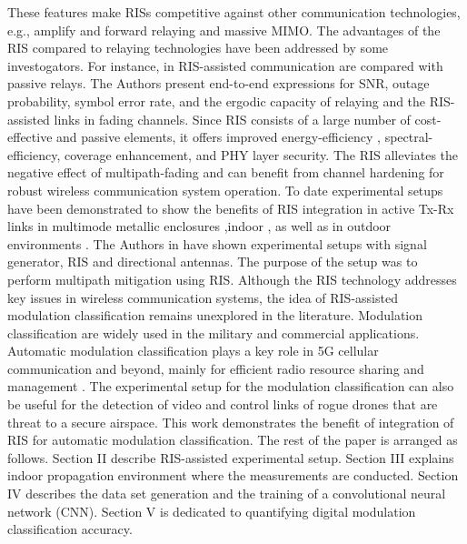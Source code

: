 \documentclass[summary]{ursi}
\begin{document}
These features make RISs competitive against other communication technologies, e.g., amplify and forward relaying and massive MIMO. The advantages of  the RIS compared to relaying technologies have been addressed by some investogators. For instance, in \cite{boulogeorgos2020performance} RIS-assisted communication are compared with passive relays. The Authors present end-to-end expressions for SNR, outage probability, symbol error rate, and the ergodic capacity of relaying and the RIS-assisted links in fading channels. Since RIS consists of a large number of cost-effective and passive elements, it offers improved energy-efficiency \cite{huang2019reconfigurable}, spectral-efficiency, coverage enhancement, and PHY layer security. The RIS alleviates the negative effect of multipath-fading and can benefit from channel hardening \cite{bjornson2020rayleigh} for robust wireless communication system operation. To date experimental setups have been demonstrated to show the benefits of RIS integration in active Tx-Rx links in multimode metallic enclosures \cite{lodro2021reconfigurable},indoor \cite{dai2020reconfigurable}, as well as in outdoor environments \cite{pei2021ris}. The Authors in \cite{zhou2021modeling} have shown experimental setups with signal generator, RIS and directional antennas. The purpose of the setup was to perform multipath mitigation using RIS. Although the RIS technology addresses key issues in wireless communication systems, the idea of RIS-assisted modulation classification remains unexplored in the literature. Modulation classification are widely used in the military and commercial applications. Automatic modulation classification plays a key role in 5G cellular communication and beyond, mainly for  efficient radio resource sharing and management \cite{kaleem2021artificial}. The experimental setup for the modulation classification can also be useful for the detection of video and control links of rogue drones that are threat to a secure airspace. This work demonstrates the benefit of integration of RIS for automatic modulation classification. The rest of the paper is arranged as follows. Section II describe RIS-assisted experimental setup. Section III explains indoor propagation environment where the measurements are conducted. Section IV describes the data set generation and the training of a convolutional neural network (CNN). Section V is dedicated to quantifying digital modulation classification accuracy.
\end{document}
